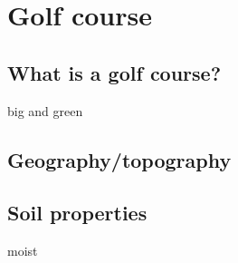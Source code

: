 \section{Golf course}

\subsection{What is a golf course?}
big and green

\subsection{Geography/topography}


\subsection{Soil properties}
moist